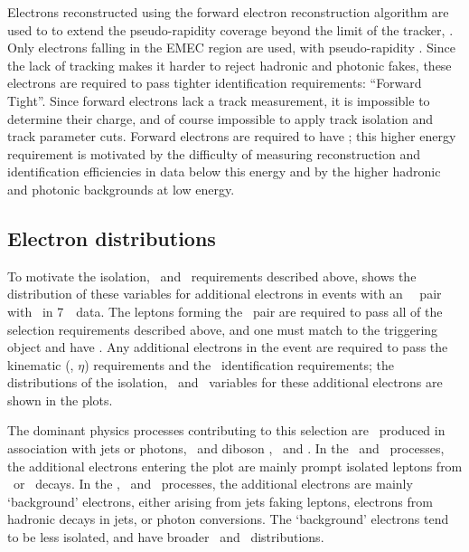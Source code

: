 Electrons reconstructed using the forward electron reconstruction algorithm are
used to to extend the pseudo-rapidity coverage beyond the limit of the tracker,
. Only electrons falling in the EMEC region are used, with
pseudo-rapidity .  Since the lack of tracking makes it
harder to reject hadronic and photonic fakes, these electrons are required to
pass tighter identification requirements: ``Forward Tight''. Since forward
electrons lack a track measurement, it is impossible to determine their charge,
and of course impossible to apply track isolation and track parameter cuts.
Forward electrons are required to have ; this higher energy requirement
is motivated by the difficulty of measuring reconstruction and identification
efficiencies in data below this energy and by the higher hadronic and photonic
backgrounds at low energy.

\subsection{Electron distributions}

To motivate the isolation, \dzerosig\ and \zzero\ requirements described
above,  shows the distribution of these variables for additional
electrons in events with an \ossf\ \dilepton\ pair with \sstooos\ in 7~\tev\ data. 
The leptons forming the \dilepton\ pair are required to pass all of
the selection requirements described above, and one must match to the triggering
object and have . Any additional electrons in the event are required to pass
the kinematic (\pt, $\eta$) requirements and the \loosePP\ identification
requirements; the distributions of the isolation, \dzerosig\ and \zzero\
variables for these additional electrons are shown in the plots. 

The dominant
physics processes contributing to this selection are \Zll\ produced in
association with jets or photons, \ttbar\ and diboson \WW, \WZ\ and \ZZ. In the
\WZ\ and \ZZ\ processes, the additional electrons entering the plot are mainly
prompt isolated leptons from \W\ or \Z\ decays. In the \Zll, \ttbar\ and \WW\
processes, the additional electrons are mainly `background' electrons, either
arising from jets faking leptons, electrons from hadronic decays in jets, or
photon conversions. The `background' electrons tend to be less isolated, and
have broader \dzerosig\ and \zzero\ distributions.


